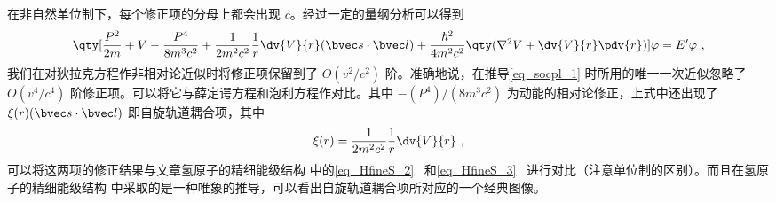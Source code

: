 在非自然单位制下，每个修正项的分母上都会出现 $c$。经过一定的量纲分析可以得到
\begin{equation}\label{eq_socpl_4}
\qty[\frac{P^2}{2m}+V-\frac{P^4}{8m^3c^2}+\frac{1}{2m^2c^2}\frac{1}{r}\dv{V}{r}(\bvec s\cdot \bvec l)+\frac{\hbar^2}{4m^2c^2}\qty(\nabla^2 V+\dv{V}{r}\pdv{r})]\varphi = E'\varphi~,
\end{equation}
我们在对狄拉克方程作非相对论近似时将修正项保留到了 $O(v^2/c^2)$ 阶。准确地说，在推导\autoref{eq_socpl_1} 时所用的唯一一次近似忽略了 $O(v^4/c^4)$ 阶修正项。可以将它与薛定谔方程和泡利方程作对比。其中 $-(P^4)/(8m^3c^2)$ 为动能的相对论修正，上式中还出现了 $\xi(r)(\bvec s\cdot \bvec l)$ 即自旋轨道耦合项，其中
\begin{equation}
\xi(r)=\frac{1}{2m^2c^2}\frac{1}{r}\dv{V}{r}~,
\end{equation}
可以将这两项的修正结果与文章氢原子的精细能级结构 中的\autoref{eq_HfineS_2}~ 和\autoref{eq_HfineS_3}~ 进行对比（注意单位制的区别）。而且在氢原子的精细能级结构 中采取的是一种唯象的推导，可以看出自旋轨道耦合项所对应的一个经典图像。

